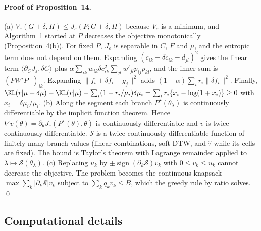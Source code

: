 \paragraph{Proof of Proposition~14.}
(a) $V_\varepsilon(G+\delta,H)\le J_\varepsilon(P;G+\delta,H)$ because $V_\varepsilon$ is a minimum, and Algorithm~1 started at $P$ decreases the objective monotonically (Proposition~4(b)). For fixed $P$, $J_\varepsilon$ is separable in $C$, $F$ and $\mu$, and the entropic term does not depend on them. Expanding $(c_{ik}+\delta c_{ik}-d_{jl})^2$ gives the linear term $\langle\partial_CJ_\varepsilon,\delta C\rangle$ plus $\alpha\sum_{ik}w_{ik}\delta c_{ik}^2\sum_{jl}w'_{jl}p_{ij}p_{kl}$, and the inner sum is $(PW'P^\top)_{ik}$. Expanding $\|f_i+\delta f_i-g_j\|^2$ adds $(1-\alpha)\sum_ir_i\|\delta f_i\|^2$. Finally, $\KL(r|\mu+\delta\mu)-\KL(r|\mu)-\sum_i(1-r_i/\mu_i)\delta\mu_i=\sum_ir_i\{x_i-\log(1+x_i)\}\ge0$ with $x_i=\delta\mu_i/\mu_i$.
(b) Along the segment each branch $P^\star(\theta_\lambda)$ is continuously differentiable by the implicit function theorem. Hence $\nabla v(\theta)=\partial_\theta J_\varepsilon(P^\star(\theta),\theta)$ is continuously differentiable and $v$ is twice continuously differentiable. $\mathcal S$ is a twice continuously differentiable function of finitely many branch values (linear combinations, soft-DTW, and $\hat\tau$ while its cells are fixed). The bound is Taylor's theorem with Lagrange remainder applied to $\lambda\mapsto\mathcal S(\theta_\lambda)$.
(c) Replacing $u_k$ by $\pm\operatorname{sign}(\partial_k\mathcal S)v_k$ with $0\le v_k\le\bar u_k$ cannot decrease the objective. The problem becomes the continuous knapsack $\max\sum_k|\partial_k\mathcal S|v_k$ subject to $\sum_kq_kv_k\le B$, which the greedy rule by ratio solves. \qed

\subsection{Computational details}

